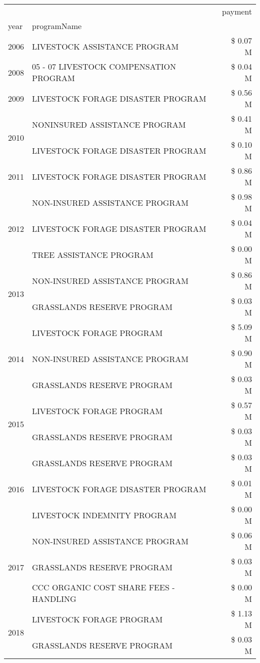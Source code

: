 \begin{tabular}{llr}
\toprule
 &  & payment \\
year & programName &  \\
\midrule
2006 & LIVESTOCK ASSISTANCE PROGRAM & \$ 0.07 M \\
\cline{1-3}
2008 & 05 - 07 LIVESTOCK COMPENSATION PROGRAM & \$ 0.04 M \\
\cline{1-3}
2009 & LIVESTOCK FORAGE DISASTER  PROGRAM & \$ 0.56 M \\
\cline{1-3}
\multirow[t]{2}{*}{2010} & NONINSURED ASSISTANCE PROGRAM & \$ 0.41 M \\
 & LIVESTOCK FORAGE DISASTER  PROGRAM & \$ 0.10 M \\
\cline{1-3}
2011 & LIVESTOCK FORAGE DISASTER PROGRAM & \$ 0.86 M \\
\cline{1-3}
\multirow[t]{3}{*}{2012} & NON-INSURED ASSISTANCE PROGRAM & \$ 0.98 M \\
 & LIVESTOCK FORAGE DISASTER PROGRAM & \$ 0.04 M \\
 & TREE ASSISTANCE PROGRAM & \$ 0.00 M \\
\cline{1-3}
\multirow[t]{2}{*}{2013} & NON-INSURED ASSISTANCE PROGRAM & \$ 0.86 M \\
 & GRASSLANDS RESERVE PROGRAM & \$ 0.03 M \\
\cline{1-3}
\multirow[t]{3}{*}{2014} & LIVESTOCK FORAGE PROGRAM & \$ 5.09 M \\
 & NON-INSURED ASSISTANCE PROGRAM & \$ 0.90 M \\
 & GRASSLANDS RESERVE PROGRAM & \$ 0.03 M \\
\cline{1-3}
\multirow[t]{2}{*}{2015} & LIVESTOCK FORAGE PROGRAM & \$ 0.57 M \\
 & GRASSLANDS RESERVE PROGRAM & \$ 0.03 M \\
\cline{1-3}
\multirow[t]{3}{*}{2016} & GRASSLANDS RESERVE PROGRAM & \$ 0.03 M \\
 & LIVESTOCK FORAGE DISASTER PROGRAM & \$ 0.01 M \\
 & LIVESTOCK INDEMNITY PROGRAM & \$ 0.00 M \\
\cline{1-3}
\multirow[t]{3}{*}{2017} & NON-INSURED ASSISTANCE PROGRAM & \$ 0.06 M \\
 & GRASSLANDS RESERVE PROGRAM & \$ 0.03 M \\
 & CCC ORGANIC COST SHARE FEES - HANDLING & \$ 0.00 M \\
\cline{1-3}
\multirow[t]{3}{*}{2018} & LIVESTOCK FORAGE PROGRAM & \$ 1.13 M \\
 & GRASSLANDS RESERVE PROGRAM & \$ 0.03 M \\

\end{tabular}
